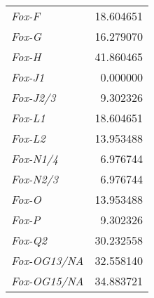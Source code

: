 \documentclass[../main.tex]{subfiles}
\begin{document}
\begin{longtable}{lr}
\textit{Fox-F}                       & 18.604651                                                                                                          \\
\textit{Fox-G}                       & 16.279070                                                                                                          \\
\textit{Fox-H}                       & 41.860465                                                                                                          \\
\textit{Fox-J1}                      & 0.000000                                                                                                           \\
\textit{Fox-J2/3}                    & 9.302326                                                                                                           \\
\textit{Fox-L1}                      & 18.604651                                                                                                          \\
\textit{Fox-L2}                      & 13.953488                                                                                                          \\
\textit{Fox-N1/4}                    & 6.976744                                                                                                           \\
\textit{Fox-N2/3}                    & 6.976744                                                                                                           \\
\textit{Fox-O}                       & 13.953488                                                                                                          \\
\textit{Fox-P}                       & 9.302326                                                                                                           \\
\textit{Fox-Q2}                      & 30.232558                                                                                                          \\
\textit{Fox-OG13/NA}                 & 32.558140                                                                                                          \\
\textit{Fox-OG15/NA}                 & 34.883721                                                                                                          \\

\end{longtable}
\end{document}
